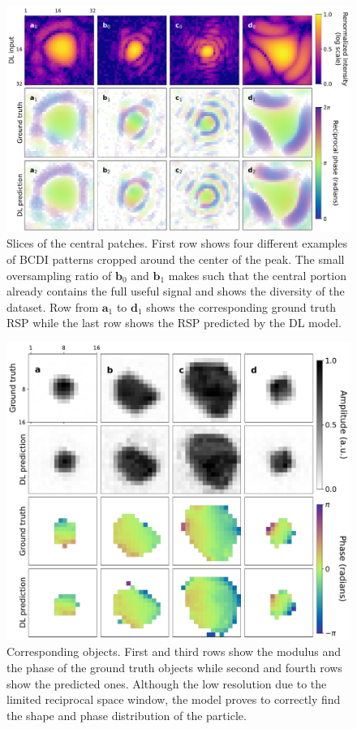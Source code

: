 \begin{figure}[H]
    \centering
    \includegraphics[width=\textwidth]{figures/Phasing/central_patch_lowstrain_RSP.pdf}
    \caption{Slices of the central patches. First row shows four different examples of BCDI patterns cropped around the 
    center of the peak. The small oversampling ratio of $\mathbf{b}_0$ and $\mathbf{b}_1$ makes such that the central portion 
    already contains the full useful signal and shows the diversity of the dataset. Row from $\mathbf{a}_1$ to $\mathbf{d}_1$
    shows the corresponding ground truth RSP while the last row shows the RSP predicted by the DL model.  }
    
    \label{fig:centralpatch_RSP_lowstrain}

\end{figure}
\begin{figure}[H]
    \centering
    \includegraphics[width=\textwidth]{figures/Phasing/central_patch_lowstrain_obj.pdf}
    \caption{Corresponding objects. First and third rows show the modulus and the phase of the ground truth objects while
    second and fourth rows show the predicted ones. Although the low resolution due to the limited reciprocal space window, 
    the model proves to correctly find the shape and phase distribution of the particle. }

    \label{fig:centralpatch_obj_lowstrain}
\end{figure}

